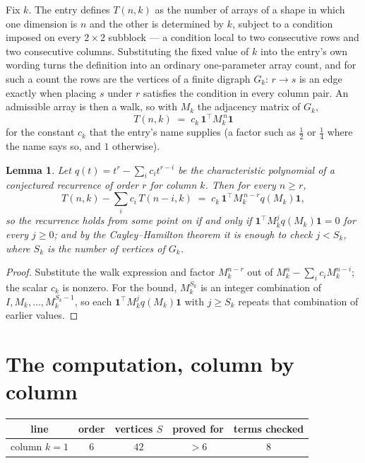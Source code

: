 \documentclass[11pt,a4paper]{article}
\theoremstyle{plain}
\newtheorem{lemma}[theorem]{Lemma}
\theoremstyle{definition}
\begin{document}
Fix $k$. The entry defines $T(n,k)$ as the number of arrays of a shape in which one dimension
is $n$ and the other is determined by $k$, subject to a condition imposed on every
$2\times2$ subblock --- a condition local to two consecutive rows and two consecutive columns.
Substituting the fixed value of $k$ into the entry's own wording turns the definition into an
ordinary one-parameter array count, and for such a count the rows are the vertices of a finite
digraph $G_k$: $r\to s$ is an edge exactly when placing $s$ under $r$ satisfies the condition
in every column pair. An admissible array is then a walk, so with $M_k$ the adjacency matrix
of $G_k$,
\[
T(n,k)\;=\;c_k\,\mathbf{1}^{\!\top}M_k^{\,n}\mathbf{1}
\]
for the constant $c_k$ that the entry's name supplies (a factor such as $\tfrac12$ or
$\tfrac14$ where the name says so, and $1$ otherwise).

\begin{lemma}\label{lem:crit}
Let $q(t)=t^{r}-\sum_i c_it^{r-i}$ be the characteristic polynomial of a conjectured
recurrence of order $r$ for column $k$. Then for every $n\ge r$,
\[
T(n,k)-\sum_i c_i\,T(n-i,k)\;=\;c_k\,\mathbf{1}^{\!\top}M_k^{\,n-r}q(M_k)\mathbf{1},
\]
so the recurrence holds from some point on if and only if
$\mathbf{1}^{\!\top}M_k^{j}q(M_k)\mathbf{1}=0$ for every $j\ge0$; and by the
Cayley--Hamilton theorem it is enough to check $j<S_k$, where $S_k$ is the number of vertices
of $G_k$.
\end{lemma}

\begin{proof}
Substitute the walk expression and factor $M_k^{n-r}$ out of $M_k^{n}-\sum_ic_iM_k^{n-i}$;
the scalar $c_k$ is nonzero. For the bound, $M_k^{S_k}$ is an integer combination of
$I,M_k,\dots,M_k^{S_k-1}$, so each $\mathbf{1}^{\!\top}M_k^{j}q(M_k)\mathbf{1}$ with
$j\ge S_k$ repeats that combination of earlier values.
\end{proof}

\section{The computation, column by column}

\begin{center}
\begin{tabular}{ccccc}
line & order & vertices $S$ & proved for & terms checked \\ \hline
column $k$$=1$ & $6$ & $42$ & $>6$ & $8$ \\
\end{tabular}
\end{center}
\end{document}
